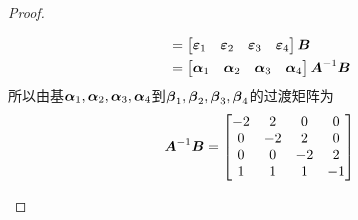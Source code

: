 \begin{proof}
\begin{enumerate}
{\begin{align*}
                   & =\begin{bmatrix}\boldsymbol{\varepsilon}_1&\boldsymbol{\varepsilon}_2&\boldsymbol{\varepsilon}_3&\boldsymbol{\varepsilon}_4\end{bmatrix}\boldsymbol{B}            \\
                   & =\begin{bmatrix}\boldsymbol{\alpha}_1&\boldsymbol{\alpha}_2&\boldsymbol{\alpha}_3&\boldsymbol{\alpha}_4\end{bmatrix}{\boldsymbol{A}}^{-1}\boldsymbol{B}
              \end{align*}
              所以由基\(\boldsymbol{\alpha}_1,\boldsymbol{\alpha}_2,\boldsymbol{\alpha}_3,\boldsymbol{\alpha}_4\)到\(\boldsymbol{\beta}_1,\boldsymbol{\beta}_2,\boldsymbol{\beta}_3,\boldsymbol{\beta}_4\)的过渡矩阵为
              \begin{equation*}
                  {\boldsymbol{A}}^{-1}\boldsymbol{B}=
                  \begin{bmatrix}
                      -2 & 2  & 0  & 0  \\
                      0  & -2 & 2  & 0  \\
                      0  & 0  & -2 & 2  \\
                      1  & 1  & 1  & -1
                  \end{bmatrix}
              \end{equation*}
              }
    \end{enumerate}
\end{proof}


